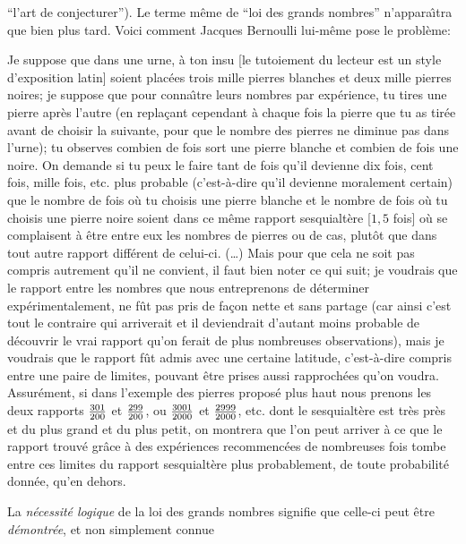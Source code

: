 ``l'art de conjecturer''). Le terme m\^eme de ``loi des grands 
nombres'' n'appara{\^\i}tra que bien plus tard. Voici comment Jacques 
Bernoulli lui-m\^eme pose le probl\`eme: 
\smallskip 
{\cit Je suppose que dans une urne, \`a ton insu [le tutoiement
du lecteur est un style d'exposition latin] soient plac\'ees trois mille 
pierres blanches et deux mille pierres noires; je suppose que pour 
conna{\^\i}tre leurs nombres par exp\'erience, tu tires une pierre
apr\`es l'autre (en repla\c{c}ant cependant \`a chaque fois la pierre
que tu as tir\'ee avant de choisir la suivante, pour que le nombre des 
pierres ne diminue pas dans l'urne); tu observes combien de fois sort 
une pierre blanche et combien de fois une noire. On demande si tu peux 
le faire tant de fois qu'il devienne dix fois, cent fois, mille fois, etc. 
plus probable (c'est-\`a-dire qu'il devienne moralement certain) que
le nombre de fois o\`u tu choisis une pierre blanche et le nombre de 
fois o\`u tu choisis une pierre noire soient dans ce m\^eme rapport 
sesquialt\`ere [$1,5$ fois] o\`u se complaisent \`a \^etre entre eux les 
nombres de pierres ou de cas, plut\^ot que dans tout autre rapport 
diff\'erent de celui-ci. (\dots ) 
\smallskip 
Mais pour que cela ne soit pas compris autrement qu'il ne convient, il 
faut bien noter ce qui suit; je voudrais que le rapport entre les
nombres que nous entreprenons de d\'eterminer exp\'erimentalement, 
ne f\^ut pas pris de fa\c{c}on nette et sans partage (car ainsi c'est tout 
le contraire qui arriverait et il deviendrait d'autant moins probable de 
d\'ecouvrir le vrai rapport qu'on ferait de plus nombreuses 
observations), mais je voudrais que le rapport f\^ut admis avec une 
certaine latitude, c'est-\`a-dire compris entre une paire de limites, 
pouvant \^etre prises aussi rapproch\'ees qu'on voudra. Assur\'ement, 
si dans l'exemple des pierres propos\'e plus haut nous prenons les deux 
rapports ${301\over 200}$ et ${299\over 200}$, ou ${3001\over 
2000}$ et ${2999\over 2000}$, etc. dont le sesquialt\`ere est tr\`es 
pr\`es et du plus grand et du plus petit, on montrera que l'on peut 
arriver \`a ce que le rapport trouv\'e gr\^ace \`a des exp\'eriences 
recommenc\'ees de nombreuses fois tombe entre ces limites du 
rapport sesquialt\`ere plus probablement, de toute probabilit\'e 
donn\'ee, qu'en dehors. 
\smallskip 
{} \par }
\medskip 
La {\it n\'ecessit\'e logique} de la loi des grands nombres signifie que 
celle-ci peut \^etre {\it d\'emontr\'ee}, et non simplement connue
